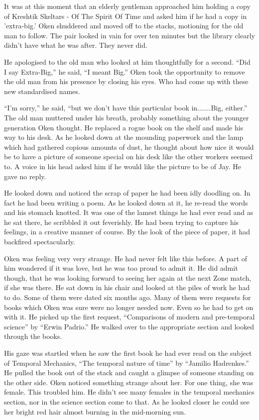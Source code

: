It was at this moment that an elderly gentleman approached him holding a copy of Kreshtik Skeltars - Of The Spirit Of Time and asked him if he had a copy in 'extra-big.'  Oken shuddered and moved off to the stacks, motioning for the old man to follow.  The pair looked in vain for over ten minutes but the library clearly didn't have what he was after.  They never did.

He apologised to the old man who looked at him thoughtfully for a second.  ``Did I say Extra-Big,'' he said, ``I meant Big.''  Oken took the opportunity to remove the old man from his presence by closing his eyes.  Who had come up with these new standardised names.

``I'm sorry,'' he said, ``but we don't have this particular book in.......Big, either.''  The old man muttered under his breath, probably something about the younger generation Oken thought.  He replaced a rogue book on the shelf and made his way to his desk.  As he looked down at the mounding paperwork and the lamp which had gathered copious amounts of dust, he thought about how nice it would be to have a picture of someone special on his desk like the other workers seemed to.  A voice in his head asked him if he would like the picture to be of Jay.  He gave no reply.

He looked down and noticed the scrap of paper he had been idly doodling on.  In fact he had been writing a poem.  As he looked down at it, he re-read the words and his stomach knotted.  It was one of the lamest things he had ever read and as he sat there, he scribbled it out feverishly.  He had been trying to capture his feelings, in a creative manner of course.  By the look of the piece of paper, it had backfired spectacularly.  

Oken was feeling very very strange.  He had never felt like this before.  A part of him wondered if it was love, but he was too proud to admit it.  He did admit though, that he was looking forward to seeing her again at the next Zone match, if she was there.  He sat down in his chair and looked at the piles of work he had to do.  Some of them were dated six months ago.  Many of them were requests for books which Oken was sure were no longer needed now.  Even so he had to get on with it.  He picked up the first request, ``Comparisons of modern and pre-temporal science'' by ``Erwin Padrio.''  He walked over to the appropriate section and looked through the books.

His gaze was startled when he saw the first book he had ever read on the subject of Temporal Mechanics, ``The temporal nature of time'' by ``Jamilio Hadrenkes.''  He pulled the book out of the stack and caught a glimpse of someone standing on the other side.  Oken noticed something strange about her.  For one thing, she was female.  This troubled him.  He didn't see many females in the temporal mechanics section, nor in the science section come to that.  As he looked closer he could see her bright red hair almost burning in the mid-morning sun.  

